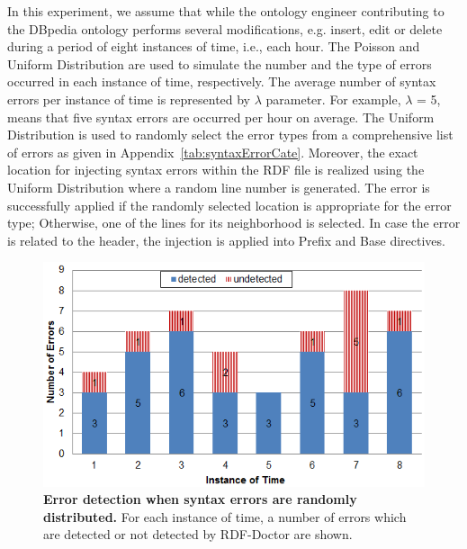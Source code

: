 In this experiment, we assume that while the ontology engineer contributing to the DBpedia ontology performs several modifications, e.g. insert, edit or delete during a period of eight instances of time, i.e., each hour. 
The Poisson and Uniform Distribution are used to simulate the number and the type of errors occurred in each instance of time, respectively.
The average number of syntax errors per instance of time is represented by $\lambda$ parameter. 
For example, $\lambda$ = 5, means that five syntax errors are occurred per hour on average.  
The Uniform Distribution is used to randomly select the error types from a comprehensive list of errors as given in Appendix~\ref{tab:syntaxErrorCate}.
Moreover, the exact location for injecting syntax errors within the RDF file is realized using the Uniform Distribution where a random line number is generated.
The error is successfully applied if the randomly selected location is appropriate for the error type; Otherwise, one of the lines for its neighborhood is selected. 
In case the error is related to the header, the injection is applied into Prefix and Base directives.  

	\begin{figure}[ht]
	\begin{center}
		\includegraphics[scale=0.9,angle=0]{images/Experiment02-02.png}
				\vspace*{-4mm}
		\caption{\textbf{Error detection when syntax errors are randomly distributed.} 
		For each instance of time, a number of errors which are detected or not detected by RDF-Doctor are shown.
		} 
		\label{Fig:Experiment02-02}
	\end{center}
\end{figure}




